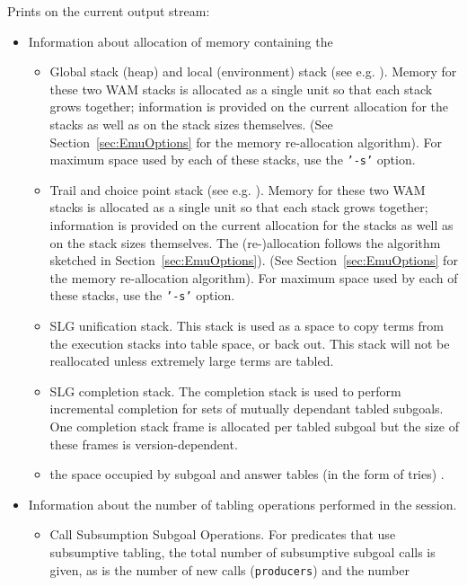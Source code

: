 \begin{description}
 Prints on the current
    output stream: 
\begin{itemize} 
\item Information about allocation of memory  containing the 
\begin{itemize} 
\item Global stack (heap) and local (environment) stack (see e.g.
\cite{AitK90}). Memory for these two WAM stacks is allocated as a
single unit so that each stack grows together; information is provided
on the current allocation for the stacks as well as on the stack sizes
themselves.  (See Section~\ref{sec:EmuOptions} for the memory
re-allocation algorithm).  For maximum space used by each of these
stacks, use the {\tt '-s'} option.
%
\item Trail and choice point stack (see e.g. \cite{AitK90}).  Memory
for these two WAM stacks is allocated as a single unit so that each
stack grows together; information is provided on the current
allocation for the stacks as well as on the stack sizes themselves.
The (re-)allocation follows the algorithm sketched in
Section~\ref{sec:EmuOptions}).  (See Section~\ref{sec:EmuOptions} for
the memory re-allocation algorithm).  For maximum space used by each
of these stacks, use the {\tt '-s'} option.
\item SLG unification stack.  This stack is used as a space to copy
terms from the execution stacks into table space, or back out.  This
stack will not be reallocated unless extremely large terms are tabled.
%
\item SLG completion stack.  The completion stack is used to perform
incremental completion for sets of mutually dependant tabled
subgoals.  One completion stack frame is allocated per tabled subgoal
\cite{SaSw98} but the size of these frames is version-dependent.
%
\item the space occupied by subgoal and answer tables (in the form of
tries) \cite{RRSSW98}.
\end{itemize}
\item Information about the number of tabling operations performed in
the session.
\begin{itemize}
\item Call Subsumption Subgoal Operations.  For predicates that use
subsumptive tabling, the total number of subsumptive subgoal calls is
given, as is the number of new calls ({\tt producers}) and the number

\end{itemize}
\end{itemize}
\end{description}
